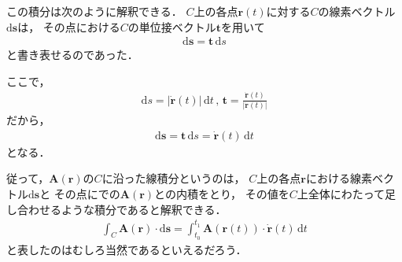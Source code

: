 この積分は次のように解釈できる．
$C$上の各点$\bm{r}(t)$に対する$C$の線素ベクトル$\mathrm{d}\bm{s}$は，
その点における$C$の単位接ベクトル$\bm{t}$を用いて
\begin{align*}
\mathrm{d}\bm{s} = \bm{t} \, \mathrm{d} s
\end{align*}
と書き表せるのであった．

ここで，
\begin{align*}
\mathrm{d}s = \lvert \dot{ \bm{r} } (t) \rvert \, \mathrm{d} t
\, , \, \bm{t} = \frac{ \dot{ \bm{r} }(t) } { \lvert \dot{ \bm{r} }(t) \rvert}
\end{align*}
だから，
\begin{align}
\mathrm{d} \bm{s} = \bm{t} \, \mathrm{d} s = \dot{ \bm{r} } (t)  \, \mathrm{d}t
\label{eq:sensoparameta}
\end{align}
となる．

従って，$\bm{A}(\bm{r})$の$C$に沿った線積分というのは，
$C$上の各点$\bm{r}$における線素ベクトル$\mathrm{d}\bm{s}$と
その点にでの$\bm{A}(\bm{r})$との内積をとり，
その値を$C$上全体にわたって足し合わせるような積分であると解釈できる．
\begin{align}
\int_C \bm{A} (\bm{r} ) \cdot \mathrm{d} \bm{s} 
= \int_{t_0}^{t_1} \bm{A} ( \bm{r} (t) ) \cdot \dot{ \bm{r} }(t) \, \mathrm{d} t
\label{eq:sensekibunvec}
\end{align}  
と表したのはむしろ当然であるといえるだろう．

